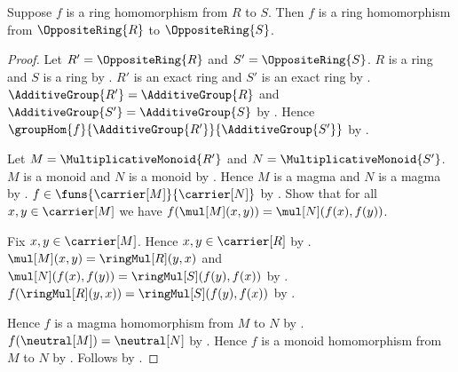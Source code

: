 \begin{theorem}\label{ring_hom_between_opposite_rings}
    Suppose $f$ is a ring homomorphism from $R$ to $S$.
    Then $f$ is a ring homomorphism from
        $\OppositeRing{R}$ to $\OppositeRing{S}$.
\end{theorem}
\begin{proof}
    Let $R'=\OppositeRing{R}$ and $S'=\OppositeRing{S}$.
    $R$ is a ring and $S$ is a ring by
        .
    $R'$ is an exact ring and $S'$ is an exact ring by
        .
    $\AdditiveGroup{R'}=\AdditiveGroup{R}$ and
        $\AdditiveGroup{S'}=\AdditiveGroup{S}$ by
        .
    Hence $\groupHom{f}{\AdditiveGroup{R'}}{\AdditiveGroup{S'}}$ by
        .

    Let $M=\MultiplicativeMonoid{R'}$ and
        $N=\MultiplicativeMonoid{S'}$.
    $M$ is a monoid and $N$ is a monoid by
        .
    Hence $M$ is a magma and $N$ is a magma by
        .
    $f\in\funs{\carrier[M]}{\carrier[N]}$ by
        .
    Show that for all $x,y\in\carrier[M]$ we have
        $f(\mul[M](x,y))=\mul[N](f(x),f(y))$.
    \begin{subproof}
        Fix $x,y\in\carrier[M]$.
        Hence $x,y\in\carrier[R]$ by
            .
        $\mul[M](x,y)=\ringMul[R](y,x)$ and
            $\mul[N](f(x),f(y))=\ringMul[S](f(y),f(x))$ by
            .
        $f(\ringMul[R](y,x))=\ringMul[S](f(y),f(x))$ by
            .
    \end{subproof}
    Hence $f$ is a magma homomorphism from $M$ to $N$ by
        .
    $f(\neutral[M])=\neutral[N]$ by
        .
    Hence $f$ is a monoid homomorphism from $M$ to $N$ by
        .
    Follows by .
\end{proof}
